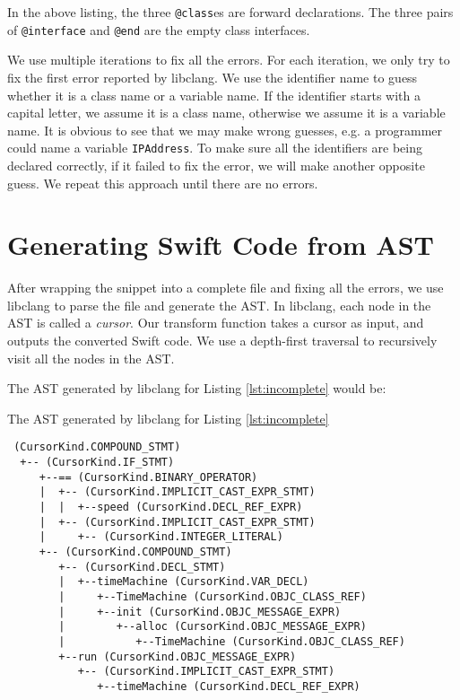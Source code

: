 \documentclass{sfuthesis}
\begin{document}
In the above listing, the three \texttt{@class}es are forward declarations. The three pairs of \texttt{@interface} and \texttt{@end} are the empty class interfaces.

We use multiple iterations to fix all the errors. For each iteration, we only try to fix the first error reported by libclang. We use the identifier name to guess whether it is a class name or a variable name. If the identifier starts with a capital letter, we assume it is a class name, otherwise we assume it is a variable name. It is obvious to see that we may make wrong guesses, e.g. a programmer could name a variable \texttt{IPAddress}. To make sure all the identifiers are being declared correctly, if it failed to fix the error, we will make another opposite guess. We repeat this approach until there are no errors.


\section{Generating Swift Code from AST}

After wrapping the snippet into a complete file and fixing all the errors, we use libclang to parse the file and generate the AST. In libclang, each node in the AST is called a \emph{cursor}. Our transform function takes a cursor as input, and outputs the converted Swift code. We use a depth-first traversal to recursively visit all the nodes in the AST.

The AST generated by libclang for Listing \ref{lst:incomplete} would be:

\begin{listing}[H]
\caption{The AST generated by libclang for Listing \ref{lst:incomplete}}
\label{lst:ast}
\begin{verbatim}
 (CursorKind.COMPOUND_STMT)
  +-- (CursorKind.IF_STMT)
     +--== (CursorKind.BINARY_OPERATOR)
     |  +-- (CursorKind.IMPLICIT_CAST_EXPR_STMT)
     |  |  +--speed (CursorKind.DECL_REF_EXPR)
     |  +-- (CursorKind.IMPLICIT_CAST_EXPR_STMT)
     |     +-- (CursorKind.INTEGER_LITERAL)
     +-- (CursorKind.COMPOUND_STMT)
        +-- (CursorKind.DECL_STMT)
        |  +--timeMachine (CursorKind.VAR_DECL)
        |     +--TimeMachine (CursorKind.OBJC_CLASS_REF)
        |     +--init (CursorKind.OBJC_MESSAGE_EXPR)
        |        +--alloc (CursorKind.OBJC_MESSAGE_EXPR)
        |           +--TimeMachine (CursorKind.OBJC_CLASS_REF)
        +--run (CursorKind.OBJC_MESSAGE_EXPR)
           +-- (CursorKind.IMPLICIT_CAST_EXPR_STMT)
              +--timeMachine (CursorKind.DECL_REF_EXPR)
\end{verbatim}
\end{listing}
\end{document}

